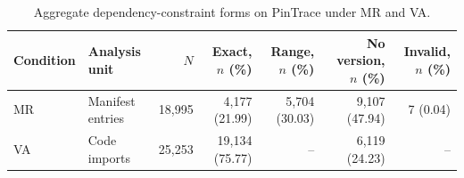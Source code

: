 \begin{table}[t]
\footnotesize
\centering
\caption{Aggregate dependency-constraint forms on PinTrace under MR and VA.}
\label{tab:rq1_constraint_forms}
\begin{tabular}{llrrrrr}
\toprule
Condition & Analysis unit & $N$ & Exact, $n$ (\%) & Range, $n$ (\%) & No version, $n$ (\%) & Invalid, $n$ (\%) \\
\midrule
MR & Manifest entries & 18,995 & 4,177 (21.99) & 5,704 (30.03) & 9,107 (47.94) & 7 (0.04) \\
VA & Code imports & 25,253 & 19,134 (75.77) & -- & 6,119 (24.23) & -- \\
\bottomrule
\end{tabular}
\end{table}

